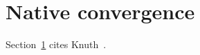 \documentclass{article}
\begin{document}
\tableofcontents
\section{Native convergence}\label{sec:native}
Section~\ref{sec:native} cites Knuth~\cite{knuth1984}.


\printindex
\end{document}
